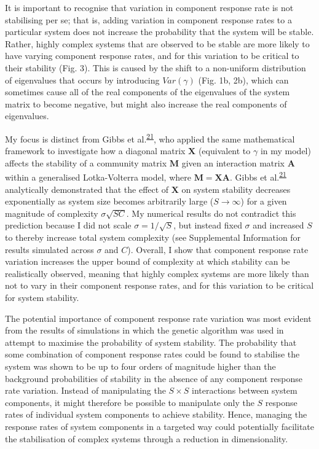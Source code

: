 \documentclass[]{article}
\begin{document}
It is important to recognise that variation in component response rate
is not stabilising per se; that is, adding variation in component
response rates to a particular system does not increase the probability
that the system will be stable. Rather, highly complex systems that are
observed to be stable are more likely to have varying component response
rates, and for this variation to be critical to their stability (Fig.
3). This is caused by the shift to a non-uniform distribution of
eigenvalues that occurs by introducing \(Var(\gamma)\) (Fig. 1b, 2b),
which can sometimes cause all of the real components of the eigenvalues
of the system matrix to become negative, but might also increase the
real components of eigenvalues.

My focus is distinct from Gibbs et
al.\textsuperscript{\protect\hyperlink{ref-Gibbs2017}{21}}, who applied
the same mathematical framework to investigate how a diagonal matrix
\(\mathbf{X}\) (equivalent to \(\gamma\) in my model) affects the
stability of a community matrix \(\mathbf{M}\) given an interaction
matrix \(\mathbf{A}\) within a generalised Lotka-Volterra model, where
\(\mathbf{M} = \mathbf{XA}\). Gibbs et
al.\textsuperscript{\protect\hyperlink{ref-Gibbs2017}{21}} analytically
demonstrated that the effect of \(\mathbf{X}\) on system stability
decreases exponentially as system size becomes arbitrarily large
(\(S \to \infty\)) for a given magnitude of complexity
\(\sigma\sqrt{SC}\). My numerical results do not contradict this
prediction because I did not scale \(\sigma = 1 / \sqrt{S}\), but
instead fixed \(\sigma\) and increased \(S\) to thereby increase total
system complexity (see Supplemental Information for results simulated
across \(\sigma\) and \(C\)). Overall, I show that component response
rate variation increases the upper bound of complexity at which
stability can be realistically observed, meaning that highly complex
systems are more likely than not to vary in their component response
rates, and for this variation to be critical for system stability.

The potential importance of component response rate variation was most
evident from the results of simulations in which the genetic algorithm
was used in attempt to maximise the probability of system stability. The
probability that some combination of component response rates could be
found to stabilise the system was shown to be up to four orders of
magnitude higher than the background probabilities of stability in the
absence of any component response rate variation. Instead of
manipulating the \(S \times S\) interactions between system components,
it might therefore be possible to manipulate only the \(S\) response
rates of individual system components to achieve stability. Hence,
managing the response rates of system components in a targeted way could
potentially facilitate the stabilisation of complex systems through a
reduction in dimensionality.
\end{document}

